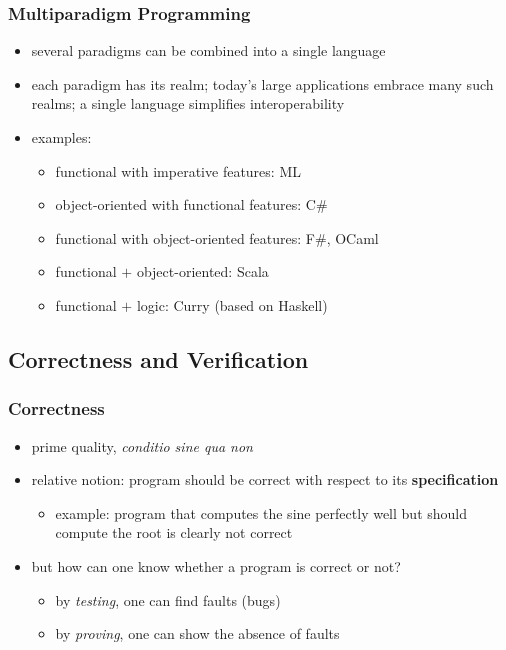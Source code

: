 \begin{multicols}{2}
\subsubsection{Multiparadigm Programming}
\begin{itemize}
  \item several paradigms can be combined into a single language
  \item each paradigm has its realm; today's large applications embrace many such realms; a single language simplifies interoperability
  \item examples:
  \begin{itemize}
    \item functional with imperative features: ML
    \item object-oriented with functional features: C\#
    \item functional with object-oriented features: F\#, OCaml
    \item functional $+$ object-oriented: Scala
    \item functional $+$ logic: Curry (based on Haskell)
  \end{itemize}
\end{itemize}

\subsection{Correctness and Verification}
\subsubsection{Correctness}
\label{sec:introCorrectness}
\begin{itemize}
  \item prime quality, \textit{conditio sine qua non}
  \item relative notion: program should be correct with respect to its \textbf{specification}
  \begin{itemize}
    \item example: program that computes the sine perfectly well but should compute the root is clearly not correct
  \end{itemize}
  \item but how can one know whether a program is correct or not?
  \begin{itemize}
    \item by \textit{testing}, one can find faults (bugs)
    \item by \textit{proving}, one can show the absence of faults
  \end{itemize}
\end{itemize}


\end{multicols}
